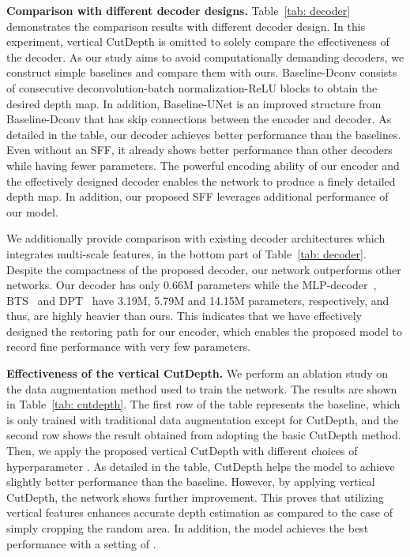 \documentclass{article}
\makeatletter
\let\@internalcite\cite
\def\cite{\def\citeauthoryear##1##2{##1, ##2}\@internalcite}
\makeatother
\begin{document}
\noindent\textbf{Comparison with different decoder designs.}
Table~\ref{tab: decoder} demonstrates the comparison results with different decoder design. In this experiment, vertical CutDepth is omitted to solely compare the effectiveness of the decoder.
As our study aims to avoid computationally demanding decoders, we construct simple baselines and compare them with ours. Baseline-Dconv consists of consecutive deconvolution-batch normalization-ReLU blocks to obtain the desired depth map. 
In addition, Baseline-UNet is an improved structure from Baseline-Dconv that has skip connections between the encoder and decoder.
As detailed in the table, our decoder achieves better performance than the baselines.
Even without an SFF, it already shows better performance than other decoders while having fewer parameters. The powerful encoding ability of our encoder and the effectively designed decoder enables the network to produce a finely detailed depth map.
In addition, our proposed SFF leverages additional performance of our model.


We additionally provide comparison with existing decoder architectures which integrates multi-scale features, in the bottom part of Table~\ref{tab: decoder}.
Despite the compactness of the proposed decoder, our network outperforms other networks. Our decoder has only 0.66M parameters while the MLP-decoder~\cite{xie2021segformer}, BTS~\cite{lee2019big} and DPT~\cite{ranftl2021vision} have 3.19M, 5.79M and 14.15M parameters, respectively, and thus, are highly heavier than ours. 
This indicates that we have effectively designed the restoring path for our encoder, which enables the proposed model to record fine performance with very few parameters.

\iffalse
\noindent\textbf{Design choice of the decoder.} 
To analyze the influence of the channel dimension  in the decoder, we train the network with varying numbers of the dimension. From Table~\ref{tab: dimension}, it is observed that  results in the most competitive model with reasonable computational cost. As the channel dimension increases, the model capacity and the performance tends to increase.  
However, our goal is to make a lightweight and powerful decoder that can express the best performance with fewer parameters, so it was designed with c=64.
\fi

\noindent\textbf{Effectiveness of the vertical CutDepth.}
We perform an ablation study on the data augmentation method used to train the network. The results are shown in Table~\ref{tab: cutdepth}. The first row of the table represents the baseline, which is only trained with traditional data augmentation except for CutDepth, and the second row shows the result obtained from adopting the basic CutDepth method. Then, we apply the proposed vertical CutDepth with different choices of hyperparameter .
As detailed in the table, CutDepth helps the model to achieve slightly better performance than the baseline. However, by applying vertical CutDepth, the network shows further improvement. This proves that utilizing vertical features enhances accurate depth estimation as compared to the case of simply cropping the random area. In addition, the model achieves the best performance with a setting of .
\end{document}
